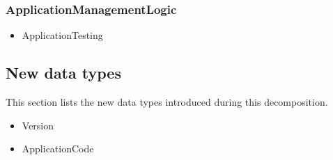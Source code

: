     \subsubsection{ApplicationManagementLogic}
        \begin{itemize}
            \item ApplicationTesting
        \end{itemize}

\subsection{New data types}
    This section lists the new data types introduced during this decomposition.

    \begin{itemize}
        \item Version
        \item ApplicationCode
    \end{itemize}
